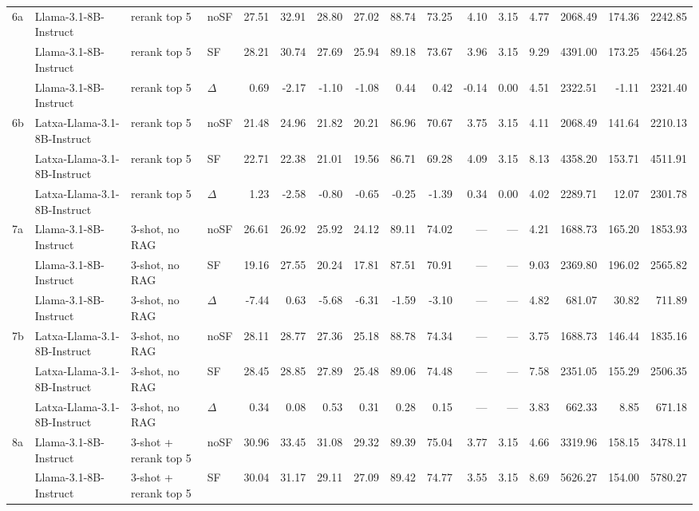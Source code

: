 \begin{landscape}
\begin{footnotesize}
\begin{longtable}{l l l l r r r r r r r r r r r r}
\midrule
6a & Llama-3.1-8B-Instruct & rerank top 5 & noSF & 27.51 & 32.91 & 28.80 & 27.02 & 88.74 & 73.25 & 4.10 & 3.15 & 4.77 & 2068.49 & 174.36 & 2242.85 \\
 & Llama-3.1-8B-Instruct & rerank top 5 & SF & 28.21 & 30.74 & 27.69 & 25.94 & 89.18 & 73.67 & 3.96 & 3.15 & 9.29 & 4391.00 & 173.25 & 4564.25 \\
 & Llama-3.1-8B-Instruct & rerank top 5 & $\Delta$ & 0.69 & -2.17 & -1.10 & -1.08 & 0.44 & 0.42 & -0.14 & 0.00 & 4.51 & 2322.51 & -1.11 & 2321.40 \\
6b & Latxa-Llama-3.1-8B-Instruct & rerank top 5 & noSF & 21.48 & 24.96 & 21.82 & 20.21 & 86.96 & 70.67 & 3.75 & 3.15 & 4.11 & 2068.49 & 141.64 & 2210.13 \\
 & Latxa-Llama-3.1-8B-Instruct & rerank top 5 & SF & 22.71 & 22.38 & 21.01 & 19.56 & 86.71 & 69.28 & 4.09 & 3.15 & 8.13 & 4358.20 & 153.71 & 4511.91 \\
 & Latxa-Llama-3.1-8B-Instruct & rerank top 5 & $\Delta$ & 1.23 & -2.58 & -0.80 & -0.65 & -0.25 & -1.39 & 0.34 & 0.00 & 4.02 & 2289.71 & 12.07 & 2301.78 \\
\midrule
7a & Llama-3.1-8B-Instruct & 3-shot, no RAG & noSF & 26.61 & 26.92 & 25.92 & 24.12 & 89.11 & 74.02 & --- & --- & 4.21 & 1688.73 & 165.20 & 1853.93 \\
 & Llama-3.1-8B-Instruct & 3-shot, no RAG & SF & 19.16 & 27.55 & 20.24 & 17.81 & 87.51 & 70.91 & --- & --- & 9.03 & 2369.80 & 196.02 & 2565.82 \\
 & Llama-3.1-8B-Instruct & 3-shot, no RAG & $\Delta$ & -7.44 & 0.63 & -5.68 & -6.31 & -1.59 & -3.10 & --- & --- & 4.82 & 681.07 & 30.82 & 711.89 \\
7b & Latxa-Llama-3.1-8B-Instruct & 3-shot, no RAG & noSF & 28.11 & 28.77 & 27.36 & 25.18 & 88.78 & 74.34 & --- & --- & 3.75 & 1688.73 & 146.44 & 1835.16 \\
 & Latxa-Llama-3.1-8B-Instruct & 3-shot, no RAG & SF & 28.45 & 28.85 & 27.89 & 25.48 & 89.06 & 74.48 & --- & --- & 7.58 & 2351.05 & 155.29 & 2506.35 \\
 & Latxa-Llama-3.1-8B-Instruct & 3-shot, no RAG & $\Delta$ & 0.34 & 0.08 & 0.53 & 0.31 & 0.28 & 0.15 & --- & --- & 3.83 & 662.33 & 8.85 & 671.18 \\
\midrule
\rowcolor{tabhighlight}8a & Llama-3.1-8B-Instruct & 3-shot + rerank top 5 & noSF & 30.96 & 33.45 & 31.08 & 29.32 & 89.39 & 75.04 & 3.77 & 3.15 & 4.66 & 3319.96 & 158.15 & 3478.11 \\
 & Llama-3.1-8B-Instruct & 3-shot + rerank top 5 & SF & 30.04 & 31.17 & 29.11 & 27.09 & 89.42 & 74.77 & 3.55 & 3.15 & 8.69 & 5626.27 & 154.00 & 5780.27 \\

\end{longtable}
\end{footnotesize}
\end{landscape}
